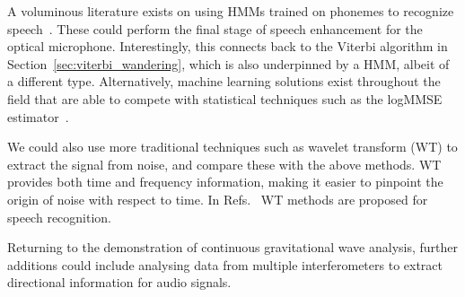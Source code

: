 \documentclass[paper-main.tex]{subfiles}
\begin{document}
A voluminous literature exists on using HMMs trained on phonemes to recognize speech~\cite{HMM_english}. These could perform the final stage of speech enhancement for the optical microphone. Interestingly, this connects back to the Viterbi algorithm in Section~\ref{sec:viterbi_wandering}, which is also underpinned by a HMM, albeit of a different type. Alternatively, machine learning solutions exist throughout the field that are able to compete with statistical techniques such as the logMMSE estimator~\cite{SEGAN}.


We could also use more traditional techniques such as wavelet transform (WT) \citep{nason1995stationary} to extract the signal from noise, and compare these with the above methods. WT provides both time and frequency information, making it easier to pinpoint the origin of noise with respect to time. In Refs.~\cite{tufekci2000feature,agbinya1996discrete} WT methods are proposed for speech recognition. 

Returning to the demonstration of continuous gravitational wave analysis, further additions could include analysing data from multiple interferometers to extract directional information for audio signals. 




\end{document}
